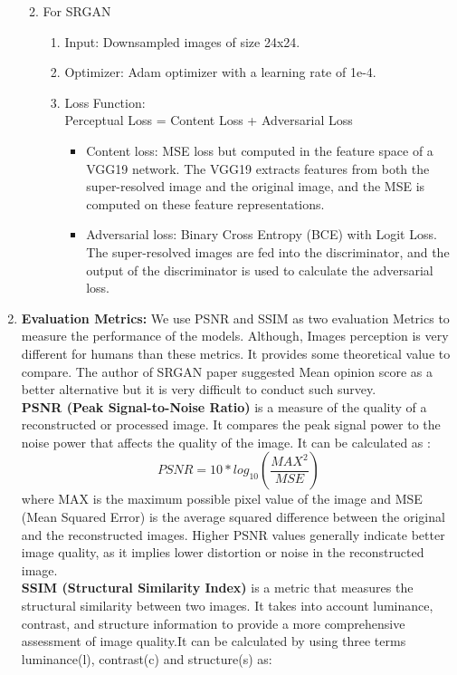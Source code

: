 \begin{enumerate}
\begin{enumerate}
\begin{enumerate}
        \end{enumerate}
        \item For SRGAN
        \begin{enumerate}
            \item Input: Downsampled images of size 24x24.
            \item Optimizer: Adam optimizer with a learning rate of 1e-4.
            \item Loss Function: \\
            Perceptual Loss = Content Loss + Adversarial Loss
            \begin{itemize}
                \item Content loss: MSE loss but computed in the feature space of a VGG19 network. The VGG19 extracts features from both the super-resolved image and the original image, and the MSE is computed on these feature representations.
                \item Adversarial loss: Binary Cross Entropy (BCE) with Logit Loss. The super-resolved images are fed into the discriminator, and the output of the discriminator is used to calculate the adversarial loss.
            \end{itemize}
        \end{enumerate}
    \end{enumerate}
    \item {\bf Evaluation Metrics:} We use PSNR and SSIM as two evaluation Metrics to measure the performance of the models. Although, Images perception is very different for humans than these metrics. It provides some theoretical value to compare. The author of SRGAN paper suggested Mean opinion score as a better alternative but it is very difficult to conduct such survey.\\
    {\bf PSNR (Peak Signal-to-Noise Ratio)} is a measure of the quality of a reconstructed or processed image. It compares the peak signal power to the noise power that affects the quality of the image. It can be calculated as :
    $$PSNR = 10*log_{10}(\frac{MAX^{2}}{MSE})$$
    where MAX is the maximum possible pixel value of the image and MSE (Mean Squared Error) is the average squared difference between the original and the reconstructed images. Higher PSNR values generally indicate better image quality, as it implies lower distortion or noise in the reconstructed image.\\
    { \bf SSIM (Structural Similarity Index)} is a metric that measures the structural similarity between two images. It takes into account luminance, contrast, and structure information to provide a more comprehensive assessment of image quality.It can be calculated by using three terms luminance(l), contrast(c) and structure(s) as:

\end{enumerate}
